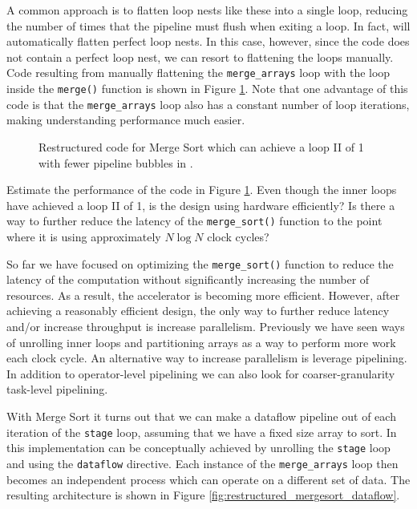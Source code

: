 A common approach is to flatten loop nests like these into a single loop, reducing the number of times that the pipeline must flush when exiting a loop.  In fact, \VHLS will automatically flatten perfect loop nests.  In this case, however, since the code does not contain a perfect loop nest, we can resort to flattening the loops manually.  Code resulting from manually flattening the \lstinline{merge_arrays} loop with the loop inside the \lstinline{merge()} function is shown in Figure \ref{fig:merge_sort_loop_merged.cpp}.  Note that one advantage of this code is that the \lstinline{merge_arrays} loop also has a constant number of loop iterations, making understanding performance much easier.

\begin{figure}

\caption{Restructured code for Merge Sort which can achieve a loop II of 1 with fewer pipeline bubbles in \VHLS.}
\label{fig:merge_sort_loop_merged.cpp}
\end{figure}

\begin{aside}
Estimate the performance of the code in Figure \ref{fig:merge_sort_loop_merged.cpp}.  Even though the inner loops have achieved a loop II of 1, is the design using hardware efficiently?  Is there a way to further reduce the latency of the \lstinline{merge_sort()} function to the point where it is using approximately $N \log N$ clock cycles?
\end{aside}

So far we have focused on optimizing the \lstinline{merge_sort()} function to reduce the latency of the computation without significantly increasing the number of resources.   As a result, the accelerator is becoming more efficient.  However, after achieving a reasonably efficient design, the only way to further reduce latency and/or increase throughput is increase parallelism.  Previously we have seen ways of unrolling inner loops and partitioning arrays as a way to perform more work each clock cycle.  An alternative way to increase parallelism is leverage pipelining.  In addition to operator-level pipelining we can also look for coarser-granularity task-level pipelining.

With Merge Sort it turns out that we can make a dataflow pipeline out of each iteration of the \lstinline{stage} loop, assuming that we have a fixed size array to sort.  In \VHLS this implementation can be conceptually achieved by unrolling the \lstinline{stage} loop and using the \lstinline{dataflow} directive.  Each instance of the \lstinline{merge_arrays} loop then becomes an independent process which can operate on a different set of data.  The resulting architecture is shown in Figure \ref{fig:restructured_mergesort_dataflow}.  

